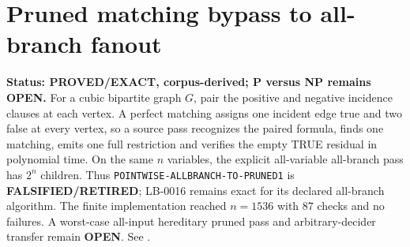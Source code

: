 \section{Pruned matching bypass to all-branch fanout}
\textbf{Status: PROVED/EXACT, corpus-derived; P versus NP remains OPEN.}
For a cubic bipartite graph $G$, pair the positive and negative incidence
clauses at each vertex.  A perfect matching assigns one incident edge true
and two false at every vertex, so a source pass recognizes the paired
formula, finds one matching, emits one full restriction and verifies the
empty TRUE residual in polynomial time.  On the same $n$ variables, the
explicit all-variable all-branch pass has $2^n$ children.  Thus
\texttt{POINTWISE-ALLBRANCH-TO-PRUNED1} is
\textbf{FALSIFIED/RETIRED}; LB-0016 remains exact for its declared
all-branch algorithm.  The finite implementation reached $n=1536$ with 87
checks and no failures.  A worst-case all-input hereditary pruned pass and
arbitrary-decider transfer remain \textbf{OPEN}.  See
.
